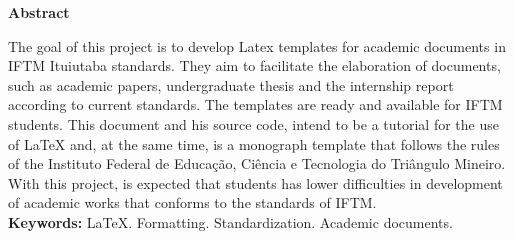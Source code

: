 \newpage
\thispagestyle{empty}
\begin{center}
\textbf{Abstract}
\end{center}
\begin{singlespace}
The goal of this project is to develop Latex templates for academic documents in IFTM Ituiutaba standards. They aim to facilitate the elaboration of documents, such as academic papers, undergraduate thesis and the internship report according to current standards. The templates are ready and available for IFTM students. This document and his source code, intend to be a tutorial for the use of LaTeX and, at the same time, is a monograph template that follows the rules of the Instituto Federal de Educação, Ciência e Tecnologia do Triângulo Mineiro. With this project, is expected that students has lower difficulties in development of academic works that conforms to the standards of IFTM.\\

\noindent \textbf{Keywords:} LaTeX. Formatting. Standardization. Academic documents.
\end{singlespace}
